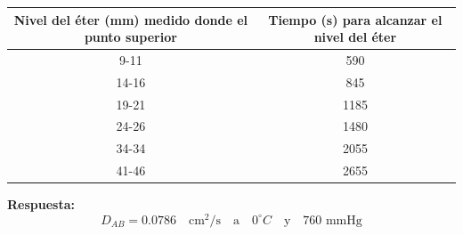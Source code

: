 \begin{center}
\begin{tabular}{|c|c|}
    \hline
    \textbf{Nivel del éter (mm) medido donde el punto superior} & \textbf{Tiempo (s) para alcanzar el nivel del éter} \\
    \hline
    9-11  & 590  \\
    14-16 & 845  \\
    19-21 & 1185 \\
    24-26 & 1480 \\
    34-34 & 2055 \\
    41-46 & 2655 \\
    \hline
\end{tabular}
\end{center}

\textbf{Respuesta:} \[
D_{AB} = 0.0786 \quad \text{cm}^2/\text{s} \quad \text{a} \quad 0^\circ C \quad \text{y} \quad 760 \text{ mmHg}
\]
\newpage
